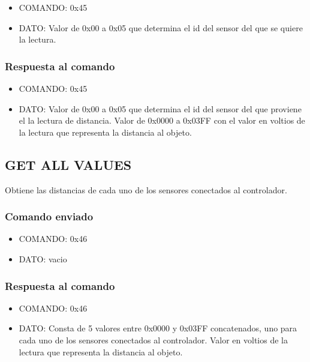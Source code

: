 \documentclass[a4paper,10pt]{article}
\begin{document}
\begin{itemize}
	\item{COMANDO:} 0x45
	\item{DATO:} Valor de 0x00 a 0x05 que determina el id del sensor del que se quiere la lectura.
\end{itemize}

\subsubsection*{Respuesta al comando}

\begin{itemize}
	\item{COMANDO:} 0x45
	\item{DATO:} Valor de 0x00 a 0x05 que determina el id del sensor del que proviene el la lectura de distancia.
	Valor de 0x0000 a 0x03FF con el valor en voltios de la lectura que representa la distancia al objeto.
\end{itemize}

\subsection{GET ALL VALUES}
\label{get_all_values_fs}

Obtiene las distancias de cada uno de los sensores conectados al controlador.

\subsubsection*{Comando enviado}

\begin{itemize}
	\item{COMANDO:} 0x46
	\item{DATO:} vacio
\end{itemize}

\subsubsection*{Respuesta al comando}

\begin{itemize}
	\item{COMANDO:} 0x46
	\item{DATO:} Consta de 5 valores entre 0x0000 y 0x03FF concatenados, uno para cada uno de los sensores conectados al controlador.
	Valor en voltios de la lectura que representa la distancia al objeto.
\end{itemize}
\end{document}
